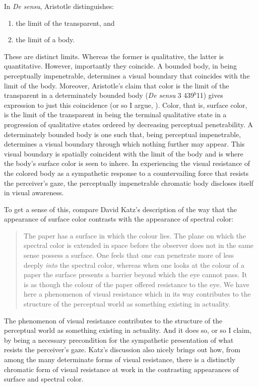 In \emph{De sensu}, Aristotle distinguishes:
\begin{enumerate}[(1)]
	\item the limit of the transparent, and
	\item the limit of a body.
\end{enumerate}
These are distinct limits. Whereas the former is qualitative, the latter is quantitative. However, importantly they coincide. A bounded body, in being perceptually impenetrable, determines a visual boundary that coincides with the limit of the body. Moreover, Aristotle’s claim that color is the limit of the transparent in a determinately bounded body (\emph{De sensu} 3 439\( ^{b} \)11) gives expression to just this coincidence (or so I argue, \citealt[chapter 3.3]{Kalderon:2015fr}). Color, that is, surface color, is the limit of the transparent in being the terminal qualitative state in a progression of qualitative states ordered by decreasing perceptual penetrability. A determinately bounded body is one such that, being perceptual impenetrable, determines a visual boundary through which nothing further may appear. This visual boundary is spatially coincident with the limit of the body and is where the body’s surface color is seen to inhere. In experiencing the visual resistance of the colored body as a sympathetic response to a countervailing force that resists the perceiver's gaze, the perceptually impenetrable chromatic body discloses itself in visual awareness.

To get a sense of this, compare David Katz's description of the way that the appearance of surface color contrasts with the appearance of spectral color:
\begin{quote}
	The paper has a surface in which the colour lies. The plane on which the spectral color is extended in space before the observer does not in the same sense possess a surface. One feels that one can penetrate more of less deeply \emph{into} the spectral color, whereas when one looks at the colour of a paper the surface presents a barrier beyond which the eye cannot pass. It is as though the colour of the paper offered resistance to the eye. We have here a phenomenon of visual resistance which in its way contributes to the structure of the perceptual world as something existing in actuality. \citep[8]{Katz:1935qv}
\end{quote}
The phenomenon of visual resistance contributes to the structure of the perceptual world as something existing in actuality. And it does so, or so I claim, by being a necessary precondition for the sympathetic presentation of what resists the perceiver's gaze. Katz's discussion also nicely brings out how, from among the many determinate forms of visual resistance, there is a distinctly chromatic form of visual resistance at work in the contrasting appearances of surface and spectral color.

